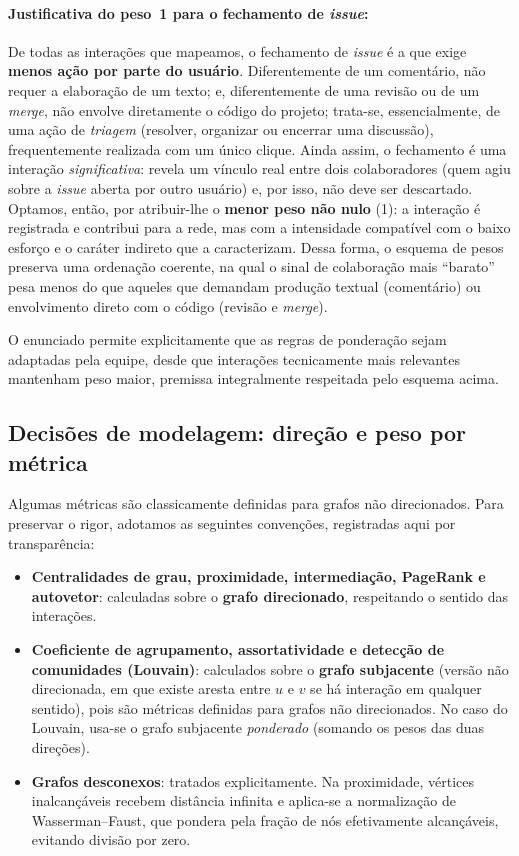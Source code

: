 \documentclass[12pt]{article}
\begin{document}
\paragraph{Justificativa do peso~1 para o fechamento de \emph{issue}:}
De todas as interações que mapeamos, o fechamento de \emph{issue} é a que exige
\textbf{menos ação por parte do usuário}. Diferentemente de um comentário, não
requer a elaboração de um texto; e, diferentemente de uma revisão ou de um
\emph{merge}, não envolve diretamente o código do projeto; trata-se,
essencialmente, de uma ação de \emph{triagem} (resolver, organizar ou encerrar
uma discussão), frequentemente realizada com um único clique. Ainda assim, o
fechamento é uma interação \emph{significativa}: revela um vínculo real entre dois
colaboradores (quem agiu sobre a \emph{issue} aberta por outro usuário) e, por
isso, não deve ser descartado. Optamos, então, por atribuir-lhe o \textbf{menor
peso não nulo} (1): a interação é registrada e contribui para a rede, mas com a
intensidade compatível com o baixo esforço e o caráter indireto que a
caracterizam. Dessa forma, o esquema de pesos preserva uma ordenação coerente,
na qual o sinal de colaboração mais ``barato'' pesa menos do que aqueles que
demandam produção textual (comentário) ou envolvimento direto com o código
(revisão e \emph{merge}).

O enunciado permite explicitamente que as regras de ponderação sejam adaptadas
pela equipe, desde que interações tecnicamente mais relevantes mantenham peso
maior, premissa integralmente respeitada pelo esquema acima.

\subsection{Decisões de modelagem: direção e peso por métrica}
\label{sec:decisoes-modelagem}

Algumas métricas são classicamente definidas para grafos não direcionados.
Para preservar o rigor, adotamos as seguintes convenções, registradas aqui por
transparência:

\begin{itemize}
  \item \textbf{Centralidades de grau, proximidade, intermediação, PageRank e
        autovetor}: calculadas sobre o \textbf{grafo direcionado}, respeitando o
        sentido das interações.
  \item \textbf{Coeficiente de agrupamento, assortatividade e detecção de
        comunidades (Louvain)}: calculados sobre o \textbf{grafo subjacente}
        (versão não direcionada, em que existe aresta entre $u$ e $v$ se há
        interação em qualquer sentido), pois são métricas definidas para grafos
        não direcionados. No caso do Louvain, usa-se o grafo subjacente
        \emph{ponderado} (somando os pesos das duas direções).
  \item \textbf{Grafos desconexos}: tratados explicitamente. Na proximidade,
        vértices inalcançáveis recebem distância infinita e aplica-se a
        normalização de Wasserman--Faust, que pondera pela fração de nós
        efetivamente alcançáveis, evitando divisão por zero.
\end{itemize}
\end{document}
